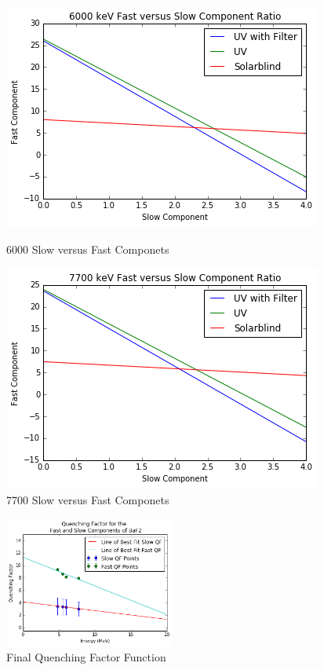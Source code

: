 \documentclass{article}
\begin{document}
\begin{figure}[H]
  \centering
  \begin{minipage}[b]{0.4\textwidth}
    \includegraphics[width=\textwidth]{third.png}
    \caption{6000 Slow versus Fast Componets}
  \end{minipage}
  \hfill
  \begin{minipage}[b]{0.4\textwidth}
    \includegraphics[width=\textwidth]{fourth.png}
    \caption{7700 Slow versus Fast Componets}
  \end{minipage}
\end{figure}

\begin{figure}
  \centering
    \includegraphics[width=0.5\textwidth]{qf.png}
  \caption{Final Quenching Factor Function}
  \label{fig:workflowedge}
\end{figure} 
\end{document}
